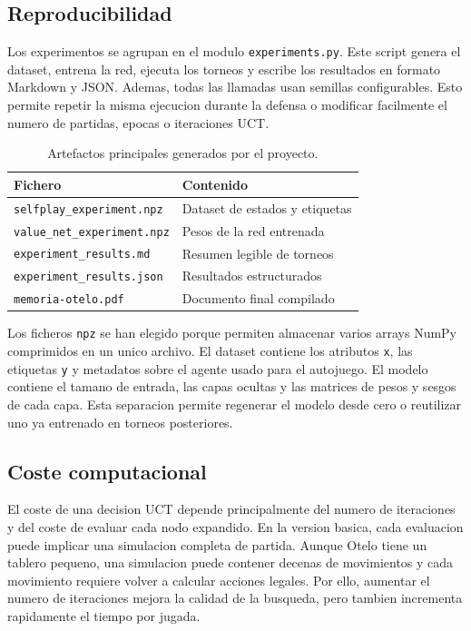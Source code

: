 \documentclass[conference,a4paper]{IEEEtran}
\begin{document}
\subsection{Reproducibilidad}

Los experimentos se agrupan en el modulo \texttt{experiments.py}. Este script
genera el dataset, entrena la red, ejecuta los torneos y escribe los resultados
en formato Markdown y JSON. Ademas, todas las llamadas usan semillas
configurables. Esto permite repetir la misma ejecucion durante la defensa o
modificar facilmente el numero de partidas, epocas o iteraciones UCT.

\begin{table}[h]
\centering
\caption{Artefactos principales generados por el proyecto.}
\label{tab:artefactos}
\begin{tabular}{ll}
\toprule
Fichero & Contenido \\
\midrule
\texttt{selfplay\_experiment.npz} & Dataset de estados y etiquetas \\
\texttt{value\_net\_experiment.npz} & Pesos de la red entrenada \\
\texttt{experiment\_results.md} & Resumen legible de torneos \\
\texttt{experiment\_results.json} & Resultados estructurados \\
\texttt{memoria-otelo.pdf} & Documento final compilado \\
\bottomrule
\end{tabular}
\end{table}

Los ficheros \texttt{npz} se han elegido porque permiten almacenar varios
arrays NumPy comprimidos en un unico archivo. El dataset contiene los atributos
\texttt{x}, las etiquetas \texttt{y} y metadatos sobre el agente usado para el
autojuego. El modelo contiene el tamano de entrada, las capas ocultas y las
matrices de pesos y sesgos de cada capa. Esta separacion permite regenerar el
modelo desde cero o reutilizar uno ya entrenado en torneos posteriores.

\subsection{Coste computacional}

El coste de una decision UCT depende principalmente del numero de iteraciones y
del coste de evaluar cada nodo expandido. En la version basica, cada evaluacion
puede implicar una simulacion completa de partida. Aunque Otelo tiene un tablero
pequeno, una simulacion puede contener decenas de movimientos y cada movimiento
requiere volver a calcular acciones legales. Por ello, aumentar el numero de
iteraciones mejora la calidad de la busqueda, pero tambien incrementa
rapidamente el tiempo por jugada.
\end{document}
